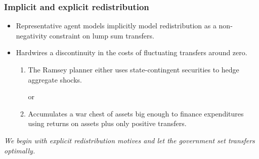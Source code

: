 \documentclass{beamer}
\begin{document}
\begin{frame}
\frametitle{Implicit and explicit redistribution}
\begin{itemize}
\item Representative agent models implicitly model redistribution as a non-negativity constraint on lump sum transfers. 

\vspace{2mm} 
 \item Hardwires a discontinuity in the costs of fluctuating transfers around zero.
 \begin{enumerate}
  
 \item The Ramsey planner either uses state-contingent securities to hedge aggregate shocks. 
 
 \begin{center}or \end{center}
 
 \item Accumulates a war chest of assets big enough to finance expenditures using returns on assets plus only positive transfers.
 
 \end{enumerate}

 
\end{itemize}

\vspace{2mm} 
\emph{\color{red}We begin with explicit redistribution motives  and let the government set transfers optimally. }

% 
% 
\end{frame}
\end{document}
